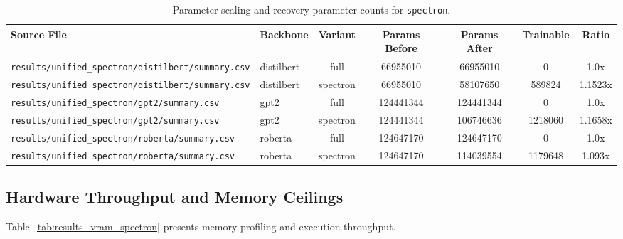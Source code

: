 \begin{table}[t]
\centering
\small
\begin{tabular}{llccccc}
\toprule
\textbf{Source File} & \textbf{Backbone} & \textbf{Variant} & \textbf{Params Before} & \textbf{Params After} & \textbf{Trainable} & \textbf{Ratio} \\
\midrule
\texttt{results/unified\_spectron/distilbert/summary.csv} & distilbert & full & 66955010 & 66955010 & 0 & 1.0x \\
\texttt{results/unified\_spectron/distilbert/summary.csv} & distilbert & spectron & 66955010 & 58107650 & 589824 & 1.1523x \\
\texttt{results/unified\_spectron/gpt2/summary.csv} & gpt2 & full & 124441344 & 124441344 & 0 & 1.0x \\
\texttt{results/unified\_spectron/gpt2/summary.csv} & gpt2 & spectron & 124441344 & 106746636 & 1218060 & 1.1658x \\
\texttt{results/unified\_spectron/roberta/summary.csv} & roberta & full & 124647170 & 124647170 & 0 & 1.0x \\
\texttt{results/unified\_spectron/roberta/summary.csv} & roberta & spectron & 124647170 & 114039554 & 1179648 & 1.093x \\
\bottomrule
\end{tabular}
\caption{Parameter scaling and recovery parameter counts for \texttt{spectron}.}
\label{tab:results_params_spectron}
\end{table}

\subsection{Hardware Throughput and Memory Ceilings}
Table~\ref{tab:results_vram_spectron} presents memory profiling and execution throughput.

